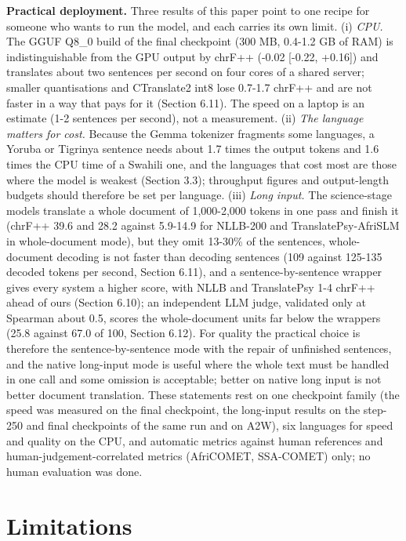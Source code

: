 \textbf{Practical deployment.} Three results of this paper point to one recipe for someone who wants to run the model, and each carries its own limit. (i) \emph{CPU.} The GGUF Q8\_0 build of the final checkpoint (300 MB, 0.4-1.2 GB of RAM) is indistinguishable from the GPU output by chrF++ (-0.02 {[}-0.22, +0.16{]}) and translates about two sentences per second on four cores of a shared server; smaller quantisations and CTranslate2 int8 lose 0.7-1.7 chrF++ and are not faster in a way that pays for it (Section 6.11). The speed on a laptop is an estimate (1-2 sentences per second), not a measurement. (ii) \emph{The language matters for cost.} Because the Gemma tokenizer fragments some languages, a Yoruba or Tigrinya sentence needs about 1.7 times the output tokens and 1.6 times the CPU time of a Swahili one, and the languages that cost most are those where the model is weakest (Section 3.3); throughput figures and output-length budgets should therefore be set per language. (iii) \emph{Long input.} The science-stage models translate a whole document of 1,000-2,000 tokens in one pass and finish it (chrF++ 39.6 and 28.2 against 5.9-14.9 for NLLB-200 and TranslatePsy-AfriSLM in whole-document mode), but they omit 13-30\% of the sentences, whole-document decoding is not faster than decoding sentences (109 against 125-135 decoded tokens per second, Section 6.11), and a sentence-by-sentence wrapper gives every system a higher score, with NLLB and TranslatePsy 1-4 chrF++ ahead of ours (Section 6.10); an independent LLM judge, validated only at Spearman about 0.5, scores the whole-document units far below the wrapper\textquotesingle s (25.8 against 67.0 of 100, Section 6.12). For quality the practical choice is therefore the sentence-by-sentence mode with the repair of unfinished sentences, and the native long-input mode is useful where the whole text must be handled in one call and some omission is acceptable; better on native long input is not better document translation. These statements rest on one checkpoint family (the speed was measured on the final checkpoint, the long-input results on the step-250 and final checkpoints of the same run and on A2W), six languages for speed and quality on the CPU, and automatic metrics against human references and human-judgement-correlated metrics (AfriCOMET, SSA-COMET) only; no human evaluation was done.

\section{Limitations}\label{limitations}

